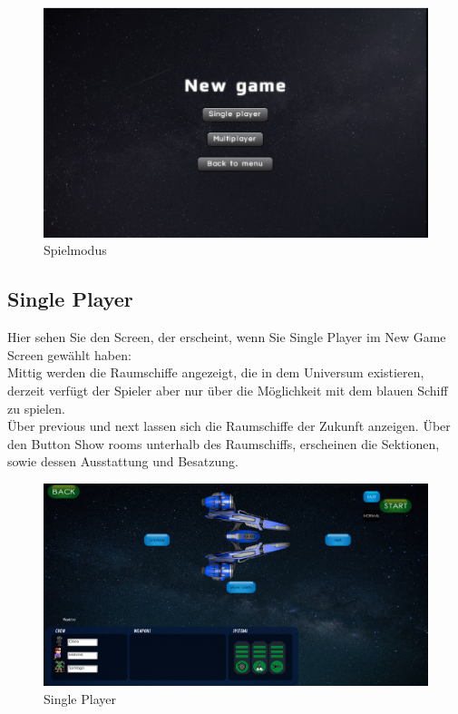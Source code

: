 \documentclass[fontsize=12pt,paper=a4,twoside]{scrartcl}
\begin{document}
\begin{figure}[htp]
	\centering
	\includegraphics[width=1.00\linewidth]{pics/gamemodescreen.png}
	\caption{Spielmodus}
\end{figure}

\subsection{Single Player}

Hier sehen Sie den Screen, der erscheint, wenn Sie Single Player im New Game Screen gewählt haben:\\
Mittig werden die Raumschiffe angezeigt, die in dem Universum existieren, derzeit verfügt der Spieler aber nur über die Möglichkeit mit dem blauen Schiff zu spielen.\\
Über previous und next lassen sich die Raumschiffe der Zukunft anzeigen. Über den Button Show rooms unterhalb des Raumschiffs, erscheinen die Sektionen, sowie dessen Ausstattung
und Besatzung.

\begin{figure}[htp]
	\centering
	\includegraphics[width=1.00\linewidth]{pics/SinglePlayer01.png}
	\caption{Single Player}
\end{figure}
\end{document}
